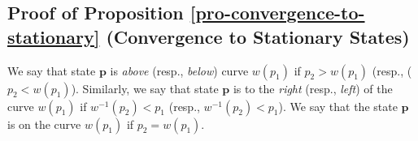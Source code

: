 \documentclass[12pt]{article}
\numberwithin{equation}{section}
\numberwithin{figure}{section}
\theoremstyle{definition}
\theoremstyle{plain}
\theoremstyle{plain}
\theoremstyle{plain}
\newtheorem{thm}{\protect\theoremname}
\theoremstyle{remark}
\theoremstyle{plain}
\theoremstyle{plain}
\providecommand{\theoremname}{Theorem}
\begin{document}





\subsection{Proof of Proposition \ref{pro-convergence-to-stationary} (Convergence to Stationary States) %
}\label{proof-convergence-to-stationary}
We say that state $\textbf{p}$ is \emph{above} (resp., \emph{below}) curve $w(p_1)$ if $p_2>w(p_1)$ (resp., ($p_2<w(p_1)$). Similarly, we say that state $\textbf{p}$ is to the \emph{right} (resp., \emph{left})  of the curve $w(p_1)$ if $w^{-1}(p_2)<p_1$ (resp., $w^{-1}(p_2)<p_1$). We say that the state $\textbf{p}$ is on the curve $w(p_1)$ if $p_2=w(p_1).$
\end{document}
